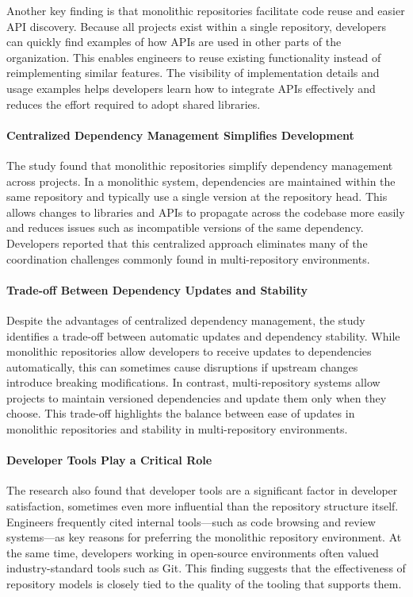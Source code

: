 Another key finding is that monolithic repositories facilitate code reuse and easier API discovery. Because all projects exist within a single repository, developers can quickly find examples of how APIs are used in other parts of the organization. This enables engineers to reuse existing functionality instead of reimplementing similar features. The visibility of implementation details and usage examples helps developers learn how to integrate APIs effectively and reduces the effort required to adopt shared libraries.

\paragraph{Centralized Dependency Management Simplifies Development}

The study found that monolithic repositories simplify dependency management across projects. In a monolithic system, dependencies are maintained within the same repository and typically use a single version at the repository head. This allows changes to libraries and APIs to propagate across the codebase more easily and reduces issues such as incompatible versions of the same dependency. Developers reported that this centralized approach eliminates many of the coordination challenges commonly found in multi-repository environments.

\paragraph{Trade-off Between Dependency Updates and Stability}

Despite the advantages of centralized dependency management, the study identifies a trade-off between automatic updates and dependency stability. While monolithic repositories allow developers to receive updates to dependencies automatically, this can sometimes cause disruptions if upstream changes introduce breaking modifications. In contrast, multi-repository systems allow projects to maintain versioned dependencies and update them only when they choose. This trade-off highlights the balance between ease of updates in monolithic repositories and stability in multi-repository environments.

\paragraph{Developer Tools Play a Critical Role}

The research also found that developer tools are a significant factor in developer satisfaction, sometimes even more influential than the repository structure itself. Engineers frequently cited internal tools—such as code browsing and review systems—as key reasons for preferring the monolithic repository environment. At the same time, developers working in open-source environments often valued industry-standard tools such as Git. This finding suggests that the effectiveness of repository models is closely tied to the quality of the tooling that supports them.

